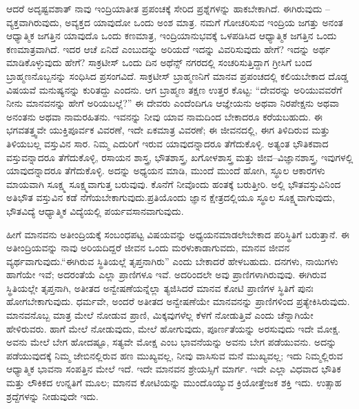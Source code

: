 \vskip -1pt

ಆದರೆ ಅದೃಷ್ಟವಶಾತ್ ನಾವು ಇಂದ್ರಿಯಾತೀತ ಪ್ರಪಂಚಕ್ಕೆ ಸೇರಿದ ಪ್ರಶ್ನೆಗಳನ್ನು ಹಾಕಬೇಕಾಗಿದೆ. ಈಗಿರುವುದು – ವ್ಯಕ್ತವಾಗಿರುವುದು, ಅವ್ಯಕ್ತದ ಯಾವುದೋ ಒಂದು ಅಂಶ ಮಾತ್ರ. ನಮಗೆ ಗೋಚರಿಸುವ ಇಂದ್ರಿಯ ಜಗತ್ತು ಅನಂತ ಆಧ್ಯಾತ್ಮಿಕ ಜಗತ್ತಿನ ಯಾವುದೊ ಒಂದು ಕಣಮಾತ್ರ, ಇಂದ್ರಿಯಾನುಭವಕ್ಕೆ ಒಳಪಡಿಸಿದ ಆಧ್ಯಾತ್ಮಿಕ ಜಗತ್ತಿನ ಒಂದು ಕಣಮಾತ್ರವಾಗಿದೆ. ಇದರ ಆಚೆ ಏನಿದೆ ಎಂಬುದನ್ನು ಅರಿಯದೆ ಇದನ್ನು ವಿವರಿಸುವುದು ಹೇಗೆ? ಇದನ್ನು ಅರ್ಥ ಮಾಡಿಕೊಳ್ಳುವುದು ಹೇಗೆ? ಸಾಕ್ರಟೀಸ್ ಒಂದು ದಿನ ಅಥೆನ್ಸ್ ನಗರದಲ್ಲಿ ಸಂಚರಿಸುತ್ತಿದ್ದಾಗ ಗ್ರೀಸಿಗೆ ಬಂದ ಬ್ರಾಹ್ಮಣನೊಬ್ಬನನ್ನು ಸಂಧಿಸಿದ ಪ್ರಸಂಗವಿದೆ. ಸಾಕ್ರಟೀಸ್ ಬ್ರಾಹ್ಮಣನಿಗೆ ಮಾನವ ಪ್ರಪಂಚದಲ್ಲಿ ಕಲಿಯಬೇಕಾದ ದೊಡ್ಡ ವಿಷಯವೆ ಮನುಷ್ಯನನ್ನು ಕುರಿತದ್ದು ಎಂದನು. ಆಗ ಬ್ರಾಹ್ಮಣ ತಕ್ಷಣ ಉತ್ತರ ಕೊಟ್ಟ: “ದೇವರನ್ನು ಅರಿಯುವವರೆಗೆ ನೀನು ಮಾನವನನ್ನು ಹೇಗೆ ಅರಿಯಬಲ್ಲೆ?” ಈ ದೇವರು ಎಂದೆಂದಿಗೂ ಆಜ್ಞೇಯನು ಅಥವಾ ನಿರಪೇಕ್ಷನು ಅಥವಾ ಅನಂತನು ಅಥವಾ ನಾಮರಹಿತನು. ಇವನನ್ನು ನೀವು ಯಾವ ನಾಮದಿಂದ ಬೇಕಾದರೂ ಕರೆಯಬಹುದು. ಈ ಭಗವತತ್ತ್ವವೇ ಯುಕ್ತಿಪೂರ್ವಕ ವಿವರಣೆ, ಇದೇ ಏಕಮಾತ್ರ ವಿವರಣೆ; ಈ ಜೀವನದಲ್ಲಿ, ಈಗ ತಿಳಿದಿರುವ ಮತ್ತು ತಿಳಿಯಬಲ್ಲ ವಸ್ತುವಿನ ಸಾರ. ನಿಮ್ಮ ಎದುರಿಗೆ ಇರುವ ಯಾವುದನ್ನಾದರೂ ತೆಗೆದುಕೊಳ್ಳಿ. ಅತ್ಯಂತ ಭೌತಿಕವಾದ ವಸ್ತುವನ್ನಾದರೂ ತೆಗೆದುಕೊಳ್ಳಿ, ರಸಾಯನ ಶಾಸ್ತ್ರ, ಭೌತಶಾಸ್ತ್ರ, ಖಗೋಳಶಾಸ್ತ್ರ ಮತ್ತು ಜೀವ–ವಿಜ್ಞಾನಶಾಸ್ತ್ರ, ಇವುಗಳಲ್ಲಿ ಯಾವುದನ್ನಾದರೂ ತೆಗೆದುಕೊಳ್ಳಿ. ಅದನ್ನು ಅಧ್ಯಯನ ಮಾಡಿ, ಮುಂದೆ ಮುಂದೆ ಹೋಗಿ, ಸ್ಥೂಲ ಆಕಾರಗಳು ಮಾಯವಾಗಿ ಸೂಕ್ಷ್ಮ ಸೂಕ್ಷ್ಮವಾಗುತ್ತ ಬರುವುವು. ಕೊನೆಗೆ ನೀವೊಂದು ಹಂತಕ್ಕೆ ಬರುತ್ತೀರಿ. ಅಲ್ಲಿ ಭೌತವಸ್ತುವಿನಿಂದ ಅತಿಭೌತ ವಸ್ತುವಿನ ಕಡೆ ನೆಗೆಯಬೇಕಾಗುವುದು.\break ಪ್ರತಿಯೊಂದು ಜ್ಞಾನ ಕ್ಷೇತ್ರದಲ್ಲಿಯೂ ಸ್ಥೂಲ ಸೂಕ್ಷ್ಮವಾಗುವುದು, ಭೌತವಿದ್ಯೆ ಆಧ್ಯಾತ್ಮಿಕ ವಿದ್ಯೆಯಲ್ಲಿ ಪರ್ಯವಸಾನವಾಗುವುದು.

\vskip -1pt

ಹೀಗೆ ಮಾನವನು ಅತೀಂದ್ರಿಯಕ್ಕೆ ಸಂಬಂಧಪಟ್ಟ ವಿಷಯವನ್ನು ಅಧ್ಯಯನ\break ಮಾಡಲೇಬೇಕಾದ ಪರಿಸ್ಥಿತಿಗೆ ಬರುತ್ತಾನೆ. ಈ ಅತೀಂದ್ರಿಯವನ್ನು ನಾವು ಅರಿಯದಿದ್ದರೆ ಜೀವನ ಒಂದು ಮರಳುಕಾಡಾಗುವದು, ಮಾನವ ಜೀವನ ವ್ಯರ್ಥವಾಗುವುದು.\break “ಈಗಿರುವ ಸ್ಥಿತಿಯಲ್ಲೆ ತೃಪ್ತನಾಗಿರು'' ಎಂದು ಬೇಕಾದರೆ ಹೇಳಬಹುದು. ದನಗಳು, ನಾಯಿಗಳು ಹಾಗೆಯೇ ಇವೆ; ಅದರಂತೆಯೆ ಎಲ್ಲಾ ಪ್ರಾಣಿಗಳೂ ಇವೆ. ಅದರಿಂದಲೇ ಅವು ಪ್ರಾಣಿಗಳಾಗಿರುವುವು. ಈಗಿರುವ ಸ್ಥಿತಿಯಲ್ಲೇ ತೃಪ್ತನಾಗಿ, ಅತೀತದ ಅನ್ವೇಷಣೆಯನ್ನೆಲ್ಲಾ ತ್ಯಜಿಸಿದರೆ ಮಾನವ ಕೋಟಿ ಪ್ರಾಣಿಗಳ ಸ್ಥಿತಿಗೆ ಪುನಃ ಹೋಗಬೇಕಾಗುವುದು. ಧರ್ಮವೇ, ಅಂದರೆ ಅತೀತದ ಅನ್ವೇಷಣೆಯೇ ಮಾನವನನ್ನು ಪ್ರಾಣಿಗಳಿಂದ ಪ್ರತ್ಯೇಕಿಸಿರುವುದು. ಮಾನವನೊಬ್ಬ ಮಾತ್ರ ಮೇಲೆ ನೋಡುವ ಪ್ರಾಣಿ, ಮಿಕ್ಕವುಗಳೆಲ್ಲ ಕೆಳಗೆ ನೋಡುತ್ತಿವೆ ಎಂದು ಚೆನ್ನಾಗಿಯೇ ಹೇಳಿರುವರು. ಹಾಗೆ ಮೇಲೆ ನೋಡುವುದು, ಮೇಲೆ ಹೋಗುವುದು, ಪೂರ್ಣತೆಯನ್ನು ಅರಸುವುದು ಇದೇ ಮೋಕ್ಷ. ಅವನು ಮೇಲೆ ಬೇಗ ಹೋದಷ್ಟೂ, ಸತ್ಯವೇ ಮೋಕ್ಷ ಎಂಬ ಭಾವನೆಯನ್ನು ಅವನು ಬೇಗ ಪಡೆಯುವನು. ಅದನ್ನು ಪಡೆಯುವುದಕ್ಕೆ ನಿಮ್ಮ ಜೇಬಿನಲ್ಲಿರುವ ಹಣ ಮುಖ್ಯವಲ್ಲ, ನೀವು ವಾಸಿಸುವ ಮನೆ ಮುಖ್ಯವಲ್ಲ; ಇದು ನಿಮ್ಮಲ್ಲಿರುವ ಆಧ್ಯಾತ್ಮಿಕ ಭಾವನಾ ಸಂಪತ್ತಿನ ಮೇಲೆ ಇದೆ. ಇದೇ ಮಾನವನ ಶ್ರೇಯಸ್ಸಿಗೆ ಮಾರ್ಗ. ಇದೇ ಎಲ್ಲಾ ವಿಧವಾದ ಭೌತಿಕ ಮತ್ತು ಲೌಕಿಕದ ಉನ್ನತಿಗೆ ಮೂಲ; ಮಾನವ ಕೋಟಿಯನ್ನು ಮುಂದೊಯ್ಯುವ ಕ್ರಿಯೋತ್ತೇಜಕ ಶಕ್ತಿ ಇದು. ಉತ್ಸಾಹ ಶ್ರದ್ದೆಗಳನ್ನು ನೀಡುವುದೇ ಇದು.

\vskip -1pt

